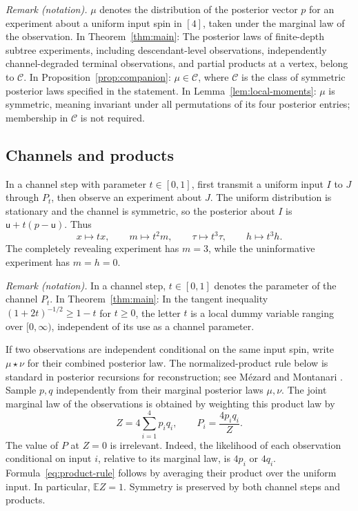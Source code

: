 \documentclass[11pt]{article}
\numberwithin{equation}{section}
\newcommand{\E}{\mathbb E}
\newcommand{\calC}{\mathcal C}
\newcommand{\unif}{\mathsf u}
\begin{document}
\noindent\textit{Remark (notation).} $\mu$ denotes the distribution of the posterior vector $p$ for an experiment about a uniform input spin in $[4]$, taken under the marginal law of the observation. In Theorem~\ref{thm:main}: The posterior laws of finite-depth subtree experiments, including descendant-level observations, independently channel-degraded terminal observations, and partial products at a vertex, belong to $\calC$. In Proposition~\ref{prop:companion}: $\mu\in\calC$, where $\calC$ is the class of symmetric posterior laws specified in the statement. In Lemma~\ref{lem:local-moments}: $\mu$ is symmetric, meaning invariant under all permutations of its four posterior entries; membership in $\calC$ is not required.


\subsection{Channels and products}

In a channel step with parameter $t\in[0,1]$, first transmit a
uniform input $I$ to $J$ through $P_t$, then observe an experiment
about $J$. The uniform distribution is stationary and the channel
is symmetric, so the posterior about $I$ is
$\unif+t(p-\unif)$. Thus
\begin{equation}\label{eq:channel-scaling}
 x\longmapsto tx,\qquad m\longmapsto t^2m,
 \qquad \tau\longmapsto t^3\tau,
 \qquad h\longmapsto t^3h.
\end{equation}
The completely revealing experiment has $m=3$, while the
uninformative experiment has $m=h=0$.

\noindent\textit{Remark (notation).} In a channel step, $t\in[0,1]$ denotes the parameter of the channel $P_t$. In Theorem~\ref{thm:main}: In the tangent inequality $(1+2t)^{-1/2}\geq1-t$ for $t\geq0$, the letter $t$ is a local dummy variable ranging over $[0,\infty)$, independent of its use as a channel parameter.


If two observations are independent conditional on the same
input spin, write $\mu\star\nu$ for their combined posterior law.
The normalized-product rule below is standard in posterior
recursions for reconstruction; see M\'ezard and Montanari
\cite[Sections~2.2--2.4]{MM06}.
Sample $p,q$ independently from their marginal posterior laws
$\mu,\nu$. The joint marginal law of the observations is obtained
by weighting this product law by
\begin{equation}\label{eq:product-rule}
 Z=4\sum_{i=1}^4p_iq_i,
 \qquad P_i=\frac{4p_iq_i}{Z}.
\end{equation}
The value of $P$ at $Z=0$ is irrelevant. Indeed, the likelihood
of each observation conditional on input $i$, relative to its
marginal law, is $4p_i$ or $4q_i$. Formula~\eqref{eq:product-rule}
follows by averaging their product over the uniform input.
In particular, $\E Z=1$. Symmetry is preserved by both channel
steps and products.
\end{document}
